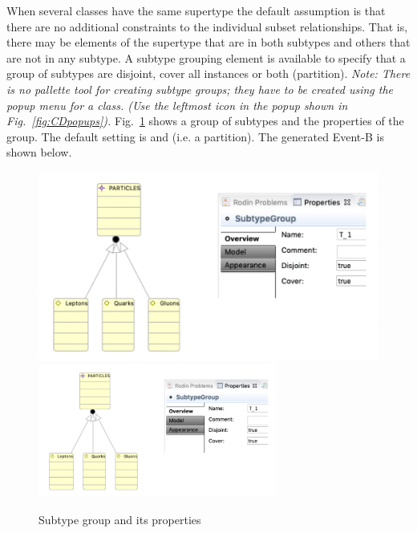 When several classes have the same supertype the default assumption is that there are no additional constraints to the individual subset relationships. That is, there may be elements of the supertype that are in both subtypes and others that are not in any subtype.
A subtype grouping element is available to specify that a group of subtypes are disjoint, cover all instances or both (partition).
\emph{Note: There is no pallette tool for creating subtype groups; they have to be created using the popup menu for a class. (Use the leftmost icon in the popup shown in Fig.~\ref{fig:CDpopups}).}
Fig.~\ref{fig:ClassSubtypeGroup} shows a group of subtypes and the properties of the group. The default setting is  and  (i.e. a partition). The generated Event-B is shown below. 

\begin{figure}[!htbp]
	\centering
	\ifplastex
	\includegraphics[width=700]{figures/ClassSubtypeGroupPartition.png}
	\else
	\includegraphics[width=0.7\textwidth]{figures/ClassSubtypeGroupPartition.png}
	\fi
	\caption{Subtype group and its properties}
	\label{fig:ClassSubtypeGroup}
\end{figure}

\END

